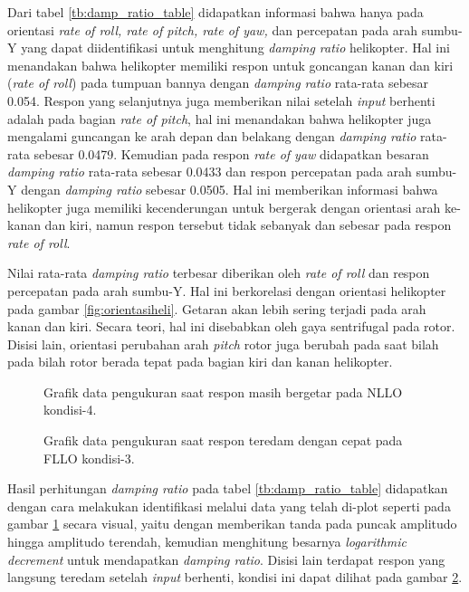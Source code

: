 Dari tabel \ref{tb:damp_ratio_table} didapatkan informasi bahwa hanya pada orientasi \textit{rate of roll, rate of pitch, rate of yaw,} dan percepatan pada arah sumbu-Y yang dapat diidentifikasi untuk menghitung \textit{damping ratio} helikopter. Hal ini menandakan bahwa helikopter memiliki respon untuk goncangan kanan dan kiri (\textit{rate of roll}) pada tumpuan bannya dengan \textit{damping ratio} rata-rata sebesar 0.054. Respon yang selanjutnya juga memberikan nilai setelah \textit{input} berhenti adalah pada bagian \textit{rate of pitch}, hal ini menandakan bahwa helikopter juga mengalami guncangan ke arah depan dan belakang dengan \textit{damping ratio} rata-rata sebesar 0.0479. Kemudian pada respon \textit{rate of yaw} didapatkan besaran \textit{damping ratio} rata-rata sebesar 0.0433 dan respon percepatan pada arah sumbu-Y dengan \textit{damping ratio} sebesar 0.0505. Hal ini memberikan informasi bahwa helikopter juga memiliki kecenderungan untuk bergerak dengan orientasi arah ke-kanan dan kiri, namun respon tersebut tidak sebanyak dan sebesar pada respon \textit{rate of roll}.

Nilai rata-rata \textit{damping ratio} terbesar diberikan oleh \textit{rate of roll} dan respon percepatan pada arah sumbu-Y. Hal ini berkorelasi dengan orientasi helikopter pada gambar \ref{fig:orientasiheli}. Getaran akan lebih sering terjadi pada arah kanan dan kiri. Secara teori, hal ini disebabkan oleh gaya sentrifugal pada rotor. Disisi lain, orientasi perubahan arah \textit{pitch} rotor juga berubah pada saat bilah pada bilah rotor berada tepat pada bagian kiri dan kanan helikopter.

\begin{figure}[H]
	\centering
	\caption{Grafik data pengukuran saat respon masih bergetar pada NLLO kondisi-4.}
	\label{fig:NLLO-4}
\end{figure}

\begin{figure}[h]
	\centering
	\caption{Grafik data pengukuran saat respon teredam dengan cepat pada FLLO kondisi-3.}
	\label{fig:FLLO-3_mark10}
\end{figure}

Hasil perhitungan \textit{damping ratio} pada tabel \ref{tb:damp_ratio_table} didapatkan dengan cara melakukan identifikasi melalui data yang telah di-plot seperti pada gambar \ref{fig:NLLO-4} secara visual, yaitu dengan memberikan tanda pada puncak amplitudo hingga amplitudo terendah, kemudian menghitung besarnya \textit{logarithmic decrement} untuk mendapatkan \textit{damping ratio}. Disisi lain terdapat respon yang langsung teredam setelah \textit{input} berhenti, kondisi ini dapat dilihat pada gambar \ref{fig:FLLO-3_mark10}.

